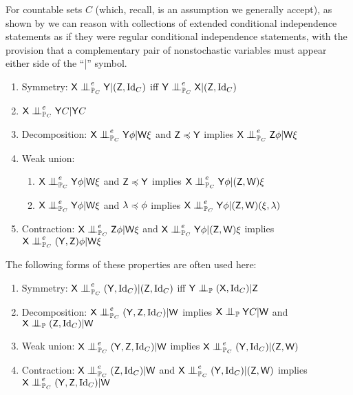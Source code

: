 For countable sets $C$ (which, recall, is an assumption we generally accept), as shown by \citet{constantinou_extended_2017} we can reason with collections of extended conditional independence statements as if they were regular conditional independence statements, with the provision that a complementary pair of nonstochastic variables must appear either side of the ``|'' symbol. 

\begin{enumerate}
    \item Symmetry: $\RV{X}\CI_{\prob{P}_C}^e \RV{Y}|(\RV{Z}, \mathrm{Id}_C)$ iff $\RV{Y}\CI_{\prob{P}_C}^e \RV{X}|(\RV{Z}, \mathrm{Id}_C)$
    \item $\RV{X}\CI_{\prob{P}_C}^e \RV{Y} C| \RV{Y} C$
    \item Decomposition: $\RV{X}\CI_{\prob{P}_C}^e \RV{Y} \phi|\RV{W}\xi$ and $\mathsf{Z}\preccurlyeq\mathsf{Y}$ implies $\RV{X}\CI_{\prob{P}_C}^e\RV{Z}\phi|\RV{W}\xi$
    \item Weak union:
    \begin{enumerate}
     	\item $\RV{X}\CI_{\prob{P}_C}^e \RV{Y} \phi|\RV{W}\xi$ and $\mathsf{Z}\preccurlyeq \mathsf{Y}$ implies $\RV{X}\CI_{\prob{P}_C}^e\RV{Y}\phi|(\RV{Z},\RV{W})\xi$
     	\item $\RV{X}\CI_{\prob{P}_C}^e \RV{Y} \phi|\RV{W}\xi$ and $\lambda\preccurlyeq \phi$ implies $\RV{X}\CI_{\prob{P}_C}^e\RV{Y}\phi|(\RV{Z},\RV{W})(\xi,\lambda)$
     \end{enumerate} 
    \item Contraction: $\RV{X}\CI_{\prob{P}_C}^e\RV{Z}\phi|\RV{W}\xi$ and $\RV{X}\CI_{\prob{P}_C}^e\RV{Y}\phi|(\RV{Z},\RV{W})\xi$ implies $\RV{X}\CI_{\prob{P}_C}^e(\RV{Y},\RV{Z})\phi|\RV{W}\xi$
\end{enumerate} 

The following forms of these properties are often used here:

\begin{enumerate}
    \item Symmetry: $\RV{X}\CI_{\prob{P}_C}^e (\RV{Y}, \mathrm{Id}_C)|(\RV{Z}, \mathrm{Id}_C)$ iff $\RV{Y}\CI_{\prob{P}} (\RV{X}, \mathrm{Id}_C)|\RV{Z}$
    \item Decomposition: $\RV{X}\CI_{\prob{P}_C}^e (\RV{Y},\RV{Z}, \mathrm{Id}_C)|\RV{W}$ implies $\RV{X}\CI_{\prob{P}}\RV{Y}C|\RV{W}$ and $\RV{X}\CI_{\prob{P}}(\RV{Z},\mathrm{Id}_C)|\RV{W}$
    \item Weak union: $\RV{X}\CI_{\prob{P}_C}^e(\RV{Y},\RV{Z},\mathrm{Id}_C)|\RV{W}$ implies $\RV{X}\CI_{\prob{P}_C}^e(\RV{Y},\mathrm{Id}_C)|(\RV{Z},\RV{W})$
    \item Contraction: $\RV{X}\CI_{\prob{P}_C}^e(\RV{Z},\mathrm{Id}_C)|\RV{W}$ and $\RV{X}\CI_{\prob{P}_C}^e(\RV{Y},\mathrm{Id}_C)|(\RV{Z},\RV{W})$ implies $\RV{X}\CI_{\prob{P}_C}^e(\RV{Y},\RV{Z},\mathrm{Id}_C)|\RV{W}$
\end{enumerate}

